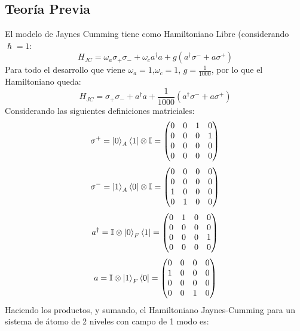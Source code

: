 \documentclass{book}
\begin{document}
\subsection{{Teoría Previa}}
El modelo de Jaynes Cumming tiene como Hamiltoniano Libre (considerando ${\hslash=1}$:
\begin{equation}{H_{JC}=\omega_a \sigma_+\sigma_-+\omega_c a^\dag a +g(a^\dag\sigma^-+a\sigma^+)}\end{equation} 
Para todo el desarrollo que viene $ {\omega_a=1}$,$ {\omega_c=1}$, $ {g=\frac{1}{1000}}$, por lo que el Hamiltoniano queda: 
\begin{equation}{H_{JC}=\sigma_+\sigma_-+a^\dag a +\frac{1}{1000}(a^\dag\sigma^-+a\sigma^+)}\end{equation} 
Considerando las siguientes definiciones matriciales:
\begin{equation}{\sigma^+=\ket{0}_A\bra{1}\otimes\mathbb{I}=\begin{pmatrix} 0&0&1&0 \\ 0&0&0&1 \\ 0&0&0&0 \\ 0&0&0&0 \end{pmatrix}}\end{equation}
\begin{equation}{\sigma^-=\ket{1}_A\bra{0}\otimes\mathbb{I}=\begin{pmatrix} 0&0&0&0 \\ 0&0&0&0 \\ 1&0&0&0 \\ 0&1&0&0 \end{pmatrix}}\end{equation}
\begin{equation}{a^\dag=\mathbb{I}\otimes\ket{0}_F\bra{1}=\begin{pmatrix} 0&1&0&0 \\ 0&0&0&0 \\ 0&0&0&1 \\ 0&0&0&0 \end{pmatrix}}\end{equation}
\begin{equation}{a=\mathbb{I}\otimes\ket{1}_F\bra{0}=\begin{pmatrix} 0&0&0&0 \\ 1&0&0&0 \\ 0&0&0&0 \\ 0&0&1&0 \end{pmatrix}}\end{equation}
Haciendo los productos, y sumando, el Hamiltoniano Jaynes-Cumming para un sistema de átomo de 2 niveles con campo de 1 modo es:
\end{document}

